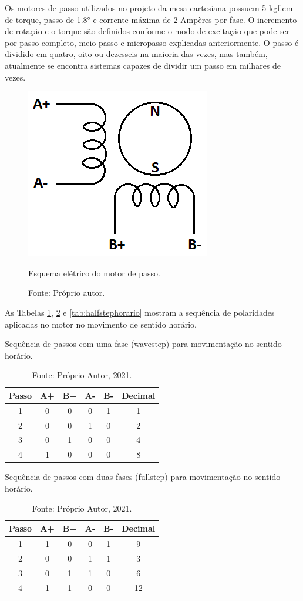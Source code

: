 Os motores de passo utilizados no projeto da mesa cartesiana possuem 5 kgf.cm de torque, passo de 1.8° e 
corrente máxima de 2 Ampères por fase. O incremento de rotação e o torque são definidos conforme o modo 
de excitação que pode ser por passo completo, meio passo e micropasso explicadas anteriormente. O passo 
é dividido em quatro, oito ou dezesseis na maioria das vezes, mas também, atualmente se encontra 
sistemas capazes de dividir um passo em milhares de vezes.

\begin{figure}[H]
\centering
\includegraphics[width = 0.3\linewidth]{figuras/meumotorbipolar}
\caption{Esquema elétrico do motor de passo.}
\caption*{Fonte: Próprio autor.}
\label{fig:meumotorbipolar}
\end{figure}
    
As Tabelas \ref{tab:wavestephorario}, \ref{tab:fullstephorario} e \ref{tab:halfstephorario} 
mostram a sequência de polaridades aplicadas no motor no movimento de sentido horário.

\begin{table}[H]
    \centering
    \caption{Sequência de passos com uma fase (wavestep) para movimentação no sentido horário.}
    \begin{tabular}{cccccc}
        \hline
        \textbf{Passo} & \textbf{A+} & \textbf{B+} & \textbf{A-} & \textbf{B-} & \textbf{Decimal}\\
        \hline
        1 & 0 & 0 & 0 & 1 & 1\\
        2 & 0 & 0 & 1 & 0 & 2\\
        3 & 0 & 1 & 0 & 0 & 4\\
        4 & 1 & 0 & 0 & 0 & 8\\        
        \hline       
    \end{tabular}
    \caption*{Fonte: Próprio Autor, 2021.}
    \label{tab:wavestephorario}
\end{table}

\begin{table}[H]
    \centering
    \caption{Sequência de passos com duas fases (fullstep) para movimentação no sentido horário.}
    \begin{tabular}{cccccc}
        \hline
        \textbf{Passo} & \textbf{A+} & \textbf{B+} & \textbf{A-} & \textbf{B-} & \textbf{Decimal}\\
        \hline
        1 & 1 & 0 & 0 & 1 & 9\\
        2 & 0 & 0 & 1 & 1 & 3\\
        3 & 0 & 1 & 1 & 0 & 6\\
        4 & 1 & 1 & 0 & 0 & 12\\
        \hline       
    \end{tabular}
    \caption*{Fonte: Próprio Autor, 2021.}
    \label{tab:fullstephorario}
\end{table}

